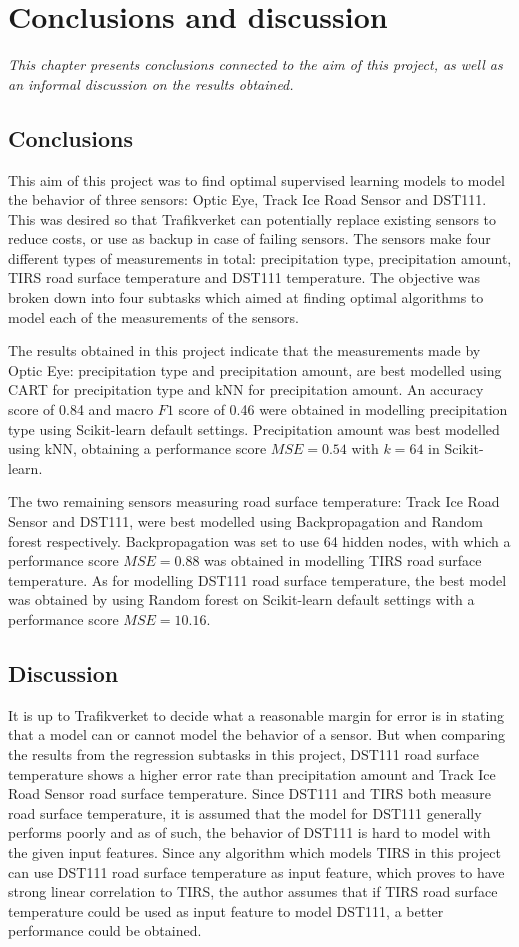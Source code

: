 \chapter{Conclusions and discussion}
\emph{This chapter presents conclusions connected to the aim of this project, as well as an informal discussion on the results obtained.}

\section{Conclusions}
	This aim of this project was to find optimal supervised learning models to model the behavior of three sensors: Optic Eye, Track Ice Road Sensor and DST111. This was desired so that Trafikverket can potentially replace existing sensors to reduce costs, or use as backup in case of failing sensors. The sensors make four different types of measurements in total: precipitation type, precipitation amount, TIRS road surface temperature and DST111 temperature. The objective was broken down into four subtasks which aimed at finding optimal algorithms to model each of the measurements of the sensors.

	The results obtained in this project indicate that the measurements made by Optic Eye: precipitation type and precipitation amount, are best modelled using CART for precipitation type and kNN for precipitation amount. An accuracy score of 0.84 and macro $F1$ score of 0.46 were obtained in modelling precipitation type using Scikit-learn default settings. Precipitation amount was best modelled using kNN, obtaining a performance score $MSE=0.54$ with $k=64$ in Scikit-learn. 

	The two remaining sensors measuring road surface temperature: Track Ice Road Sensor and DST111, were best modelled using Backpropagation and Random forest respectively. Backpropagation was set to use 64 hidden nodes, with which a performance score $MSE=0.88$ was obtained in modelling TIRS road surface temperature. As for modelling DST111 road surface temperature, the best model was obtained by using Random forest on Scikit-learn default settings with a performance score $MSE=10.16$.

\section{Discussion}

	It is up to Trafikverket to decide what a reasonable margin for error is in stating that a model can or cannot model the behavior of a sensor. But when comparing the results from the regression subtasks in this project, DST111 road surface temperature shows a higher error rate than precipitation amount and Track Ice Road Sensor road surface temperature. Since DST111 and TIRS both measure road surface temperature, it is assumed that the model for DST111 generally performs poorly and as of such, the behavior of DST111 is hard to model with the given input features. Since any algorithm which models TIRS in this project can use DST111 road surface temperature as input feature, which proves to have strong linear correlation to TIRS, the author assumes that if TIRS road surface temperature could be used as input feature to model DST111, a better performance could be obtained.

